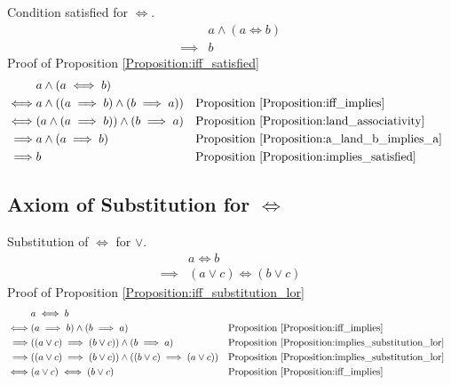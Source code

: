 \begin{prop}
\label{Proposition:iff_satisfied}
Condition satisfied for $\iff$.
\begin{align*}
& a \land (a \iff b) \\
\implies & b
\end{align*}
Proof of Proposition \ref{Proposition:iff_satisfied}
\begin{align*}
& a \land (a \iff b) \\
\iff & a \land ((a \implies b) \land (b \implies a))
& & \text{Proposition \ref{Proposition:iff_implies}} \\
\iff & (a \land (a \implies b)) \land (b \implies a)
& & \text{Proposition \ref{Proposition:land_associativity}} \\
\implies & a \land (a \implies b)
& & \text{Proposition \ref{Proposition:a_land_b_implies_a}} \\
\implies & b
& & \text{Proposition \ref{Proposition:implies_satisfied}} \\
\end{align*}
\end{prop}

\subsection{Axiom of Substitution for $\iff$}
\begin{prop}
\label{Proposition:iff_substitution_lor}
Substitution of $\iff$ for $\lor$.
\begin{align*}
& a \iff b \\
\implies & (a \lor c) \iff (b \lor c)
\end{align*}
Proof of Proposition \ref{Proposition:iff_substitution_lor}
\begin{align*}
& a \iff b \\
\iff & (a \implies b) \land (b \implies a)
& & \text{Proposition \ref{Proposition:iff_implies}} \\
\implies & ((a \lor c) \implies (b \lor c)) \land (b \implies a)
& & \text{Proposition \ref{Proposition:implies_substitution_lor}} \\
\implies & ((a \lor c) \implies (b \lor c)) \land ((b \lor c) \implies (a \lor c))
& & \text{Proposition \ref{Proposition:implies_substitution_lor}} \\
\iff & (a \lor c) \iff (b \lor c)
& & \text{Proposition \ref{Proposition:iff_implies}} \\
\end{align*}
\end{prop}

